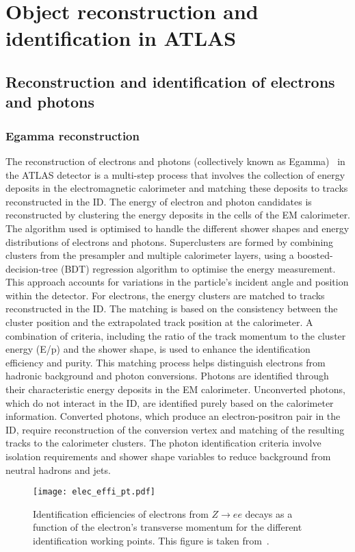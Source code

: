 \section{Object reconstruction and identification in ATLAS} 
    \subsection{Reconstruction and identification of electrons and photons} 
        \subsubsection{Egamma reconstruction}
            The reconstruction of electrons and photons (collectively known as Egamma)~\cite{EGAM-2018-01, EGAM-2021-01} in the ATLAS detector is a multi-step process that 
            involves the collection of energy deposits in the electromagnetic calorimeter and matching these deposits to tracks reconstructed 
            in the ID. The energy of electron and photon candidates is reconstructed by clustering the energy deposits in the cells of the 
            EM calorimeter. The algorithm used is optimised to handle the different shower shapes and energy distributions of electrons and 
            photons. Superclusters are formed by combining clusters from the presampler and multiple calorimeter layers, using a 
            boosted-decision-tree (BDT) regression algorithm to optimise the energy measurement. This approach accounts for variations 
            in the particle's incident angle and position within the detector. For electrons, the energy clusters are matched to tracks 
            reconstructed in the ID. The matching is based on the consistency between the cluster position and the extrapolated track position 
            at the calorimeter. A combination of criteria, including the ratio of the track momentum to the cluster energy (E/p) and the shower 
            shape, is used to enhance the identification efficiency and purity. This matching process helps distinguish electrons from hadronic 
            background and photon conversions.
            Photons are identified through their characteristic energy deposits in the EM calorimeter. Unconverted photons, which do not 
            interact in the ID, are identified purely based on the calorimeter information. Converted photons, which produce an electron-positron 
            pair in the ID, require reconstruction of the conversion vertex and matching of the resulting tracks to the calorimeter clusters. 
            The photon identification criteria involve isolation requirements and shower shape variables to reduce background from neutral hadrons and jets.
            \begin{figure}[htbp]
                \centering
                \texttt{[image: elec\_effi\_pt.pdf]}
                \caption{
                    Identification efficiencies of electrons from $Z\rightarrow ee$ decays as a function of the electron's transverse momentum for the different identification working points. This figure is taken from~\cite{EGAM-2021-01}.
                }
                \label{fig:elec_effi}
            \end{figure}
